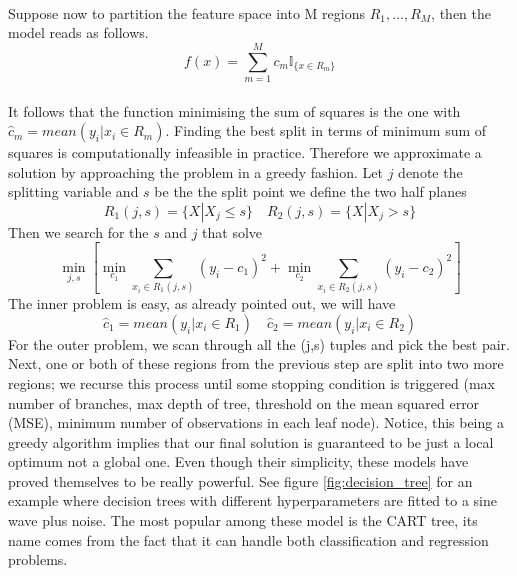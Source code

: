 \\
Suppose now to partition the feature space into M regions $R_1,\dots,R_M$, then the model reads as follows.
\begin{equation}
    f(x)=\sum\limits_{m=1}^{M}c_m\mathbb{I}_{\{x \in R_m\}}
\end{equation}
\\
It follows that the function minimising the sum of squares is the one with $\hat{c}_m=mean(y_i|x_i \in R_m)$.
Finding the best split in terms of minimum sum of squares is computationally infeasible in practice. Therefore we approximate a solution by approaching the problem in a greedy fashion.
Let $j$ denote the splitting variable and $s$ be the the split point we define the two half planes
\begin{equation}
    R_1(j,s)=\{X|X_j\leq s\} \quad R_2(j,s)=\{X|X_j >s\}
\end{equation}
Then we search for the $s$ and $j$ that solve
\begin{equation}
    \min_{j,s}\left[\min_{c_1} \sum\limits_{x_i \in R_1(j,s)}(y_i-c_1)^2+\min_{c_2} \sum\limits_{x_i \in R_2(j,s)}(y_i-c_2)^2\right]
\end{equation}
The inner problem is easy, as already pointed out, we will have 
\begin{equation}
    \hat{c}_1=mean(y_i|x_i \in R_1) \quad \hat{c}_2=mean(y_i|x_i \in R_2)
\end{equation}
For the outer problem, we scan through all the (j,s) tuples and pick the best pair. 
Next, one or both of these regions from the previous step are split into two more regions; we recurse this process until some stopping condition is triggered (max number of branches, max depth of tree, threshold on the mean squared error (MSE), minimum number of observations in each leaf node).
Notice, this being a greedy algorithm implies that our final solution is guaranteed to be just a local optimum not a global one.
Even though their simplicity, these models have proved themselves to be really powerful. See figure \ref{fig:decision_tree} for an example where decision trees with different hyperparameters are fitted to a sine wave plus noise. The most popular among these model is the CART \cite{breiman2017classification} tree, its name comes from the fact that it can handle both classification and regression problems.
